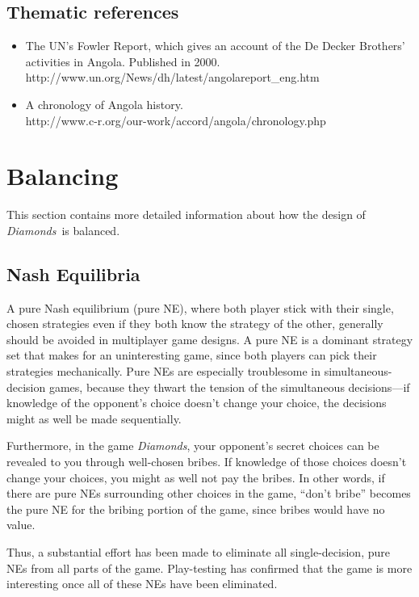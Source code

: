 \documentclass[8pt]{extarticle}
\newcommand{\gtitle}{{\it Diamonds}}
\begin{document}
\subsection{Thematic references}
\begin{itemize}
\item The UN's Fowler Report, which gives an account of the De Decker Brothers' activities in Angola.  Published in 2000.\\
http://www.un.org/News/dh/latest/angolareport\_eng.htm

\item A chronology of Angola history.\\
http://www.c-r.org/our-work/accord/angola/chronology.php
\end{itemize}


\newpage

\section{Balancing}
This section contains more detailed information about how the design of \gtitle\ is balanced.

\subsection{Nash Equilibria}
A pure Nash equilibrium (pure NE), where both player stick with their single, chosen strategies even if they both know the strategy of the other, generally should be avoided in multiplayer game designs.  A pure NE is a dominant strategy set that makes for an uninteresting game, since both players can pick their strategies mechanically.  Pure NEs are especially troublesome in simultaneous-decision games, because they thwart the tension of the simultaneous decisions---if knowledge of the opponent's choice doesn't change your choice, the decisions might as well be made sequentially.

Furthermore, in the game \gtitle, your opponent's secret choices can be revealed to you through well-chosen bribes.  If knowledge of those choices doesn't change your choices, you might as well not pay the bribes.  In other words, if there are pure NEs surrounding other choices in the game, ``don't bribe'' becomes the pure NE for the bribing portion of the game, since bribes would have no value.

Thus, a substantial effort has been made to eliminate all single-decision, pure NEs from all parts of the game.  Play-testing has confirmed that the game is more interesting once all of these NEs have been eliminated.
\end{document}
